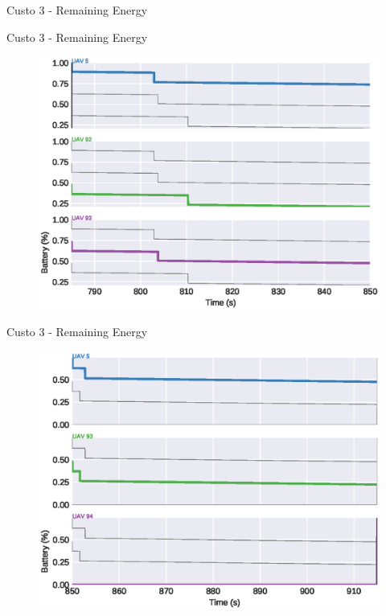 \begin{frame}{Custo 3 - Remaining Energy}
\begin{figure}[!htb]
                    \end{figure}
                \end{frame}\begin{frame}{Custo 3 - Remaining Energy}
                    \begin{figure}[!htb]
                        \includegraphics[width=\textwidth]{custo_3/uav_remaining_energy_850.eps}
                    \end{figure}
                \end{frame}\begin{frame}{Custo 3 - Remaining Energy}
                    \begin{figure}[!htb]
                        \includegraphics[width=\textwidth]{custo_3/uav_remaining_energy_915.eps}

\end{figure}
\end{frame}
